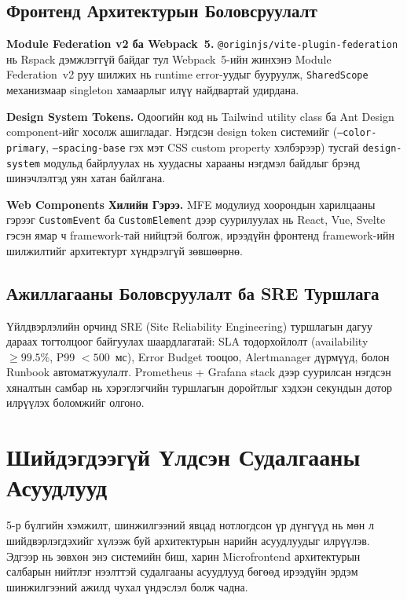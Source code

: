\subsection{Фронтенд Архитектурын Боловсруулалт}

\textbf{Module Federation v2 ба Webpack~5.} \texttt{@originjs/vite-plugin-federation}
нь Rspack дэмжлэггүй байдаг тул Webpack~5-ийн жинхэнэ Module Federation~v2
руу шилжих нь runtime error-уудыг бууруулж, \texttt{SharedScope}
механизмаар singleton хамаарлыг илүү найдвартай удирдана.

\textbf{Design System Tokens.} Одоогийн код нь Tailwind utility class ба
Ant Design component-ийг хосолж ашигладаг. Нэгдсэн design token системийг
(\texttt{--color-primary}, \texttt{--spacing-base} гэх мэт CSS custom
property хэлбэрээр) тусгай \texttt{design-system} модульд байрлуулах нь
хуудасны харааны нэгдмэл байдлыг брэнд шинэчлэлтэд уян хатан байлгана.

\textbf{Web Components Хилийн Гэрээ.} MFE модулиуд хоорондын харилцааны
гэрээг \texttt{CustomEvent} ба \texttt{CustomElement} дээр суурилуулах нь
React, Vue, Svelte гэсэн ямар ч framework-тай нийцтэй болгож, ирээдүйн
фронтенд framework-ийн шилжилтийг архитектурт хүндрэлгүй зөвшөөрнө.

\subsection{Ажиллагааны Боловсруулалт ба SRE Туршлага}

Үйлдвэрлэлийн орчинд SRE (Site Reliability Engineering) туршлагын дагуу
дараах тогтолцоог байгуулах шаардлагатай: SLA тодорхойлолт
(availability $\geq 99.5\%$, P99 $< 500$~мс), Error Budget тооцоо,
Alertmanager дүрмүүд, болон Runbook автоматжуулалт. Prometheus + Grafana
stack дээр суурилсан нэгдсэн хяналтын самбар нь хэрэглэгчийн туршлагын
доройтлыг хэдхэн секундын дотор илрүүлэх боломжийг олгоно.

\section{Шийдэгдээгүй Үлдсэн Судалгааны Асуудлууд}

5-р бүлгийн хэмжилт, шинжилгээний явцад нотлогдсон үр дүнгүүд нь мөн л
шийдвэрлэгдэхийг хүлээж буй архитектурын нарийн асуудлуудыг илрүүлэв.
Эдгээр нь зөвхөн энэ системийн биш, харин Microfrontend архитектурын
салбарын нийтлэг нээлттэй судалгааны асуудлууд бөгөөд ирээдүйн эрдэм
шинжилгээний ажилд чухал үндэслэл болж чадна.

